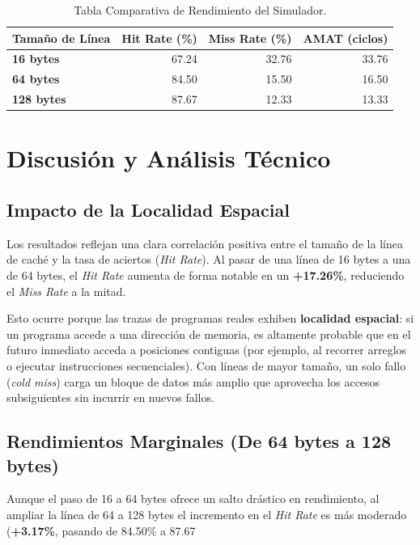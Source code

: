 \documentclass[12pt,a4paper]{article}
\begin{document}
\begin{table}[h!]
\centering
\caption{Tabla Comparativa de Rendimiento del Simulador.}
\label{tab:resultados}
\vspace{0.2cm}
\begin{tabular}{lrrr}
\toprule
\textbf{Tamaño de Línea} & \textbf{Hit Rate (\%)} & \textbf{Miss Rate (\%)} & \textbf{AMAT (ciclos)} \\
\midrule
\textbf{16 bytes}  & 67.24 & 32.76 & 33.76 \\
\textbf{64 bytes}  & 84.50 & 15.50 & 16.50 \\
\textbf{128 bytes} & 87.67 & 12.33 & 13.33 \\
\bottomrule
\end{tabular}
\end{table}

\section{Discusión y Análisis Técnico}

\subsection{Impacto de la Localidad Espacial}
Los resultados reflejan una clara correlación positiva entre el tamaño de la línea de caché y la tasa de aciertos (\textit{Hit Rate}). Al pasar de una línea de 16 bytes a una de 64 bytes, el \textit{Hit Rate} aumenta de forma notable en un \textbf{+17.26\%}, reduciendo el \textit{Miss Rate} a la mitad.

Esto ocurre porque las trazas de programas reales exhiben \textbf{localidad espacial}: si un programa accede a una dirección de memoria, es altamente probable que en el futuro inmediato acceda a posiciones contiguas (por ejemplo, al recorrer arreglos o ejecutar instrucciones secuenciales). Con líneas de mayor tamaño, un solo fallo (\textit{cold miss}) carga un bloque de datos más amplio que aprovecha los accesos subsiguientes sin incurrir en nuevos fallos.

\subsection{Rendimientos Marginales (De 64 bytes a 128 bytes)}
Aunque el paso de 16 a 64 bytes ofrece un salto drástico en rendimiento, al ampliar la línea de 64 a 128 bytes el incremento en el \textit{Hit Rate} es más moderado (\textbf{+3.17\%}, pasando de 84.50\% a 87.67%
\end{document}
